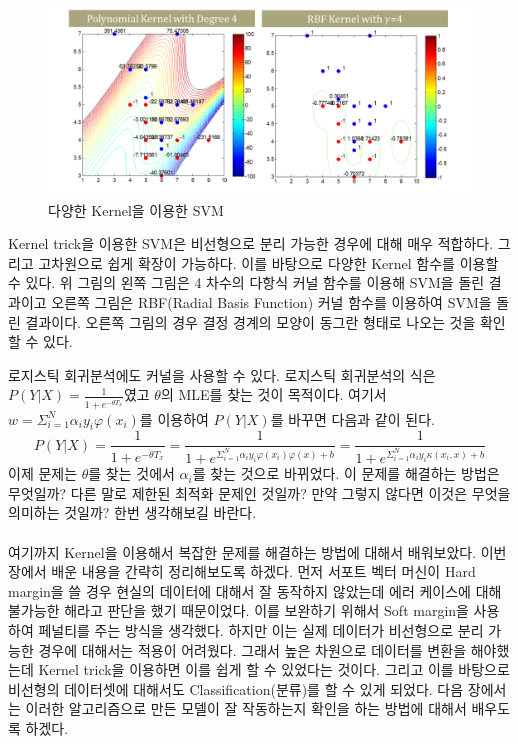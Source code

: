 \documentclass[a4paper]{oblivoir}
\begin{document}
\begin{figure}[ht]\centering
\includegraphics[scale=0.5]{SVM_variouskernel}\caption{다양한 Kernel을 이용한 SVM}\label{Fig:5-24}
\end{figure}
\indent Kernel trick을 이용한 SVM은 비선형으로 분리 가능한 경우에 대해 매우 적합하다. 그리고 고차원으로 쉽게 확장이 가능하다. 이를 바탕으로 다양한 Kernel 함수를 이용할 수 있다. 위 그림의 왼쪽 그림은 4 차수의 다항식 커널 함수를 이용해 SVM을 돌린 결과이고 오른쪽 그림은 RBF(Radial Basis Function) 커널 함수를 이용하여 SVM을 돌린 결과이다. 오른쪽 그림의 경우 결정 경계의 모양이 동그란 형태로 나오는 것을 확인할 수 있다.

\indent 로지스틱 회귀분석에도 커널을 사용할 수 있다. 로지스틱 회귀분석의 식은 $P(Y|X)=\frac{1}{1+e^{-\dot{\theta}T_x}}$였고 $\theta$의 MLE를 찾는 것이 목적이다. 여기서 $w=\Sigma_{i=1}^{N} \alpha_i y_i \varphi(x_i)$를 이용하여 $P(Y|X)$를 바꾸면 다음과 같이 된다.
\begin{equation}
P(Y|X)=\frac{1}{1+e^{-\dot{\theta}T_x}}=\frac{1}{1+e^{\Sigma_{i=1}^N \alpha_i y_i \varphi(x_i)\varphi(x)+b}}=\frac{1}{1+e^{\Sigma_{i=1}^N \alpha_i y_i \kappa(x_i,x)+b}}
\label{eq:5-47}
\end{equation}
이제 문제는 $\theta$를 찾는 것에서 $\alpha_i$를 찾는 것으로 바뀌었다. 이 문제를 해결하는 방법은 무엇일까? 다른 말로 제한된 최적화 문제인 것일까? 만약 그렇지 않다면 이것은 무엇을 의미하는 것일까? 한번 생각해보길 바란다.\\\\

\indent 여기까지 Kernel을 이용해서 복잡한 문제를 해결하는 방법에 대해서 배워보았다. 이번 장에서 배운 내용을 간략히 정리해보도록 하겠다. 먼저 서포트 벡터 머신이 Hard margin을 쓸 경우 현실의 데이터에 대해서 잘 동작하지 않았는데 에러 케이스에 대해 불가능한 해라고 판단을 했기 때문이었다. 이를 보완하기 위해서 Soft margin을 사용하여 페널티를 주는 방식을 생각했다. 하지만 이는 실제 데이터가 비선형으로 분리 가능한 경우에 대해서는 적용이 어려웠다. 그래서 높은 차원으로 데이터를 변환을 해야했는데 Kernel trick을 이용하면 이를 쉽게 할 수 있었다는 것이다. 그리고 이를 바탕으로 비선형의 데이터셋에 대해서도 Classification(분류)를 할 수 있게 되었다. 다음 장에서는 이러한 알고리즘으로 만든 모델이 잘 작동하는지 확인을 하는 방법에 대해서 배우도록 하겠다.
\end{document}
